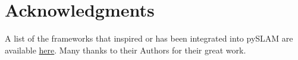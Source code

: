 \documentclass{article}
\providecommand{\tightlist}{%
  \setlength{\itemsep}{0pt}\setlength{\parskip}{0pt}}
\begin{document}
\hypertarget{credits}{%
\section*{Acknowledgments}\label{credits}}

A list of the frameworks that inspired or has been integrated into pySLAM are available \href{https://github.com/luigifreda/pyslam?tab=readme-ov-file#credits}{here}. Many thanks to their Authors for their great work.
%
\end{document}
